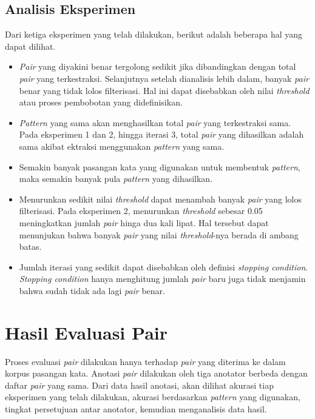 \subsection{Analisis Eksperimen}
Dari ketiga eksperimen yang telah dilakukan, berikut adalah beberapa hal yang dapat dilihat.
\begin{itemize}
  \item \textit{Pair} yang diyakini benar tergolong sedikit jika dibandingkan dengan total \textit{pair} yang terkestraksi. Selanjutnya setelah dianalisis lebih dalam, banyak \textit{pair} benar yang tidak lolos filterisasi. Hal ini dapat disebabkan oleh nilai \textit{threshold} atau proses pembobotan yang didefinisikan.
  \item \textit{Pattern} yang sama akan menghasilkan total \textit{pair} yang terkestraksi sama. Pada eksperimen 1 dan 2, hingga iterasi 3, total \textit{pair} yang dihasilkan adalah sama akibat ektraksi menggunakan \textit{pattern} yang sama.
  \item Semakin banyak pasangan kata yang digunakan untuk membentuk \textit{pattern}, maka semakin banyak pula \textit{pattern} yang dihasilkan.
  \item Menurunkan sedikit nilai \textit{threshold} dapat menambah banyak \textit{pair} yang lolos filterisasi. Pada eksperimen 2, menurunkan \textit{threshold} sebesar 0.05 meningkatkan jumlah \textit{pair} hinga dua kali lipat. Hal tersebut dapat menunjukan bahwa banyak \textit{pair} yang nilai \textit{threshold}-nya berada di ambang batas. 
  \item Jumlah iterasi yang sedikit dapat disebabkan oleh definisi \textit{stopping condition}. \textit{Stopping condition} hanya menghitung jumlah \textit{pair} baru juga tidak menjamin bahwa sudah tidak ada lagi \textit{pair} benar. 
\end{itemize}

\section{Hasil Evaluasi Pair}
Proses evaluasi \textit{pair} dilakukan hanya terhadap \textit{pair} yang diterima ke dalam korpus pasangan kata. Anotasi \textit{pair} dilakukan oleh tiga anotator berbeda dengan daftar \textit{pair} yang sama. Dari data hasil anotasi, akan dilihat akurasi tiap eksperimen yang telah dilakukan, akurasi berdasarkan \textit{pattern} yang digunakan, tingkat persetujuan antar anotator, kemudian menganalisis data hasil.

